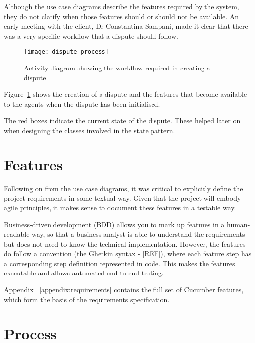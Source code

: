 Although the use case diagrams describe the features required by the system, they do not clarify when those features should or should not be available. An early meeting with the client, Dr Constantina Sampani, made it clear that there was a very specific workflow that a dispute should follow.

\begin{figure}[h!]
  \centering
    \ifimages
    \texttt{[image: dispute\_process]}
    \fi
  \caption{Activity diagram showing the workflow required in creating a dispute}
  \label{uml:activity:dispute}
\end{figure}

Figure~\ref{uml:activity:dispute} shows the creation of a dispute and the features that become available to the agents when the dispute has been initialised.

The red boxes indicate the current state of the dispute. These helped later on when designing the classes involved in the state pattern.

\section{Features}

Following on from the use case diagrams, it was critical to explicitly define the project requirements in some textual way. Given that the project will embody agile principles, it makes sense to document these features in a testable way.

Business-driven development (BDD) allows you to mark up features in a human-readable way, so that a business analyst is able to understand the requirements but does not need to know the technical implementation. However, the features do follow a convention (the Gherkin syntax - [REF]), where each feature step has a corresponding step definition represented in code. This makes the features executable and allows automated end-to-end testing.

Appendix ~\ref{appendix:requirements} contains the full set of Cucumber features, which form the basis of the requirements specification.

\section{Process} %

